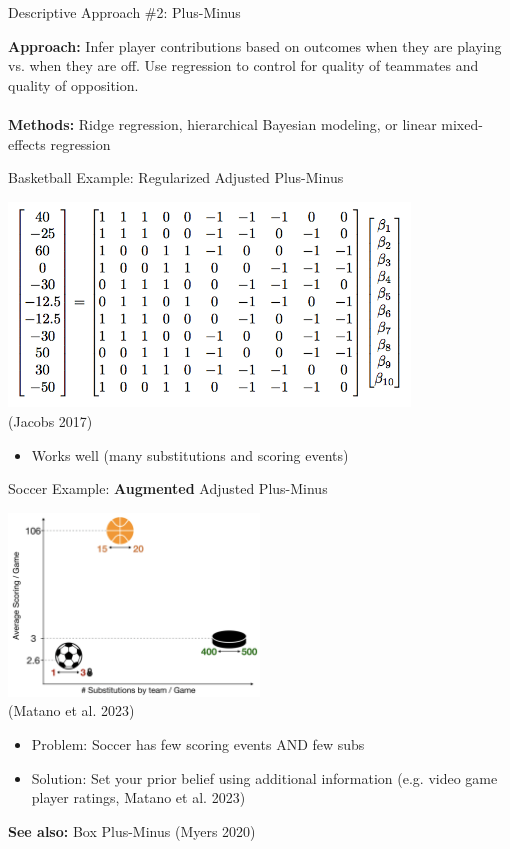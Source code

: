 \documentclass{beamer}
\begin{document}
\begin{frame}{Descriptive Approach \#2: Plus-Minus}

  {\bf Approach:} Infer player contributions based on outcomes when they are playing vs. when they are off. Use regression to control for quality of teammates and quality of opposition.\\
  ~\\
  {\bf Methods:} Ridge regression, hierarchical Bayesian modeling, or linear mixed-effects regression
\end{frame}


\begin{frame}{Basketball Example: Regularized Adjusted Plus-Minus}
  \begin{center}
    \includegraphics[width = 0.8\textwidth]{images/rapm.png}\\
    {\scriptsize\color{gray} (Jacobs 2017)}
  \end{center}
  \begin{itemize}
     \item Works well (many substitutions and scoring events)
  \end{itemize}
\end{frame}


\begin{frame}{Soccer Example: {\bf Augmented} Adjusted Plus-Minus}
  \begin{center}
    \includegraphics[width = 0.5\textwidth]{images/aapm.png}\\
    {\scriptsize\color{gray} (Matano et al. 2023)}
    \begin{itemize}
       \item Problem: Soccer has few scoring events AND few subs
       \item Solution: Set your prior belief using additional information (e.g. video game player ratings, Matano et al. 2023)
    \end{itemize}
  \end{center}
  {\bf See also:} Box Plus-Minus (Myers 2020)
\end{frame}
\end{document}
